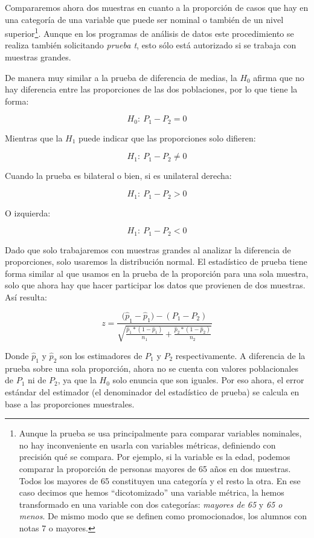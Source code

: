 \documentclass[]{book}
\let\rmarkdownfootnote\footnote%
\def\footnote{\protect\rmarkdownfootnote}
\begin{document}
Compararemos ahora dos muestras en cuanto a la proporción de casos que
hay en una categoría de una variable que puede ser nominal o también de
un nivel superior\footnote{Aunque la prueba se usa principalmente para comparar variables nominales, no hay inconveniente en usarla con variables métricas, definiendo con precisión qué se compara. Por ejemplo, si la variable es la edad, podemos comparar la proporción de personas mayores de 65 años en dos muestras. Todos los mayores de 65 constituyen una categoría y el resto la otra. En ese caso decimos que hemos ``dicotomizado'' una variable métrica, la hemos transformado en una variable con dos categorías: \emph{mayores de 65} y \emph{65 o menos}. De mismo modo que se definen como promocionados, los alumnos con notas 7 o mayores.}. Aunque en los programas de análisis de datos
este procedimiento se realiza también solicitando \emph{prueba t}, esto sólo
está autorizado si se trabaja con muestras grandes.

De manera muy similar a la prueba de diferencia de medias, la \(H_0\)
afirma que no hay diferencia entre las proporciones de las dos
poblaciones, por lo que tiene la forma:

\[H_{0}:\ P_{1} - P_{2} = 0\]

Mientras que la \(H_1\) puede indicar que las proporciones solo difieren:

\[H_{1}:\ P_{1} - P_{2} \neq 0\]

Cuando la prueba es bilateral o bien, si es unilateral derecha:

\[H_{1}:\ P_{1} - P_{2} > 0\]

O izquierda:

\[H_{1}:\ P_{1} - P_{2} < 0\]

Dado que solo trabajaremos con muestras grandes al analizar la
diferencia de proporciones, solo usaremos la distribución normal. El
estadístico de prueba tiene forma similar al que usamos en la prueba de
la proporción para una sola muestra, solo que ahora hay que hacer
participar los datos que provienen de dos muestras. Así resulta:

\[z = \frac{{(\widehat{p}}_{1} - {\widehat{p}}_{1}) - (P_{1} - P_{2})}{\sqrt{\frac{{\widehat{p}}_{1}*(1 - {\widehat{p}}_{1})}{n_{1}} + \frac{{\widehat{p}}_{2}*(1 - {\widehat{p}}_{2})}{n_{2}}}}\]

Donde \({\widehat{p}}_{1}\) y \({\widehat{p}}_{2}\) son los estimadores de
\(P_1\) y \(P_2\) respectivamente. A diferencia de la prueba sobre una sola
proporción, ahora no se cuenta con valores poblacionales de \(P_1\) ni de \(P_2\), ya que la \(H_0\) solo enuncia que son iguales. Por eso ahora, el error estándar del estimador (el denominador del estadístico de prueba) se calcula en base a las proporciones muestrales.
\end{document}
